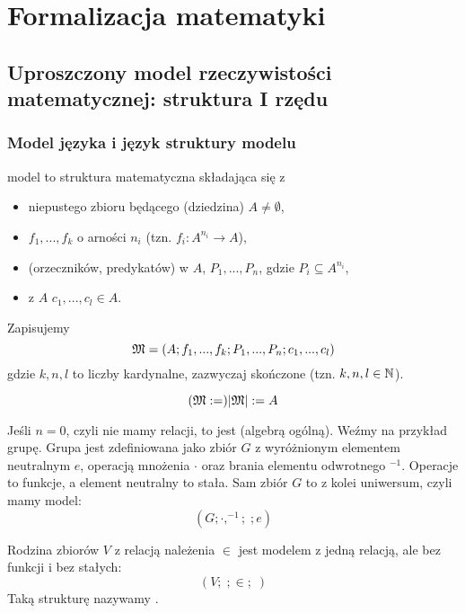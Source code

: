 \chapter{Formalizacja matematyki}

\section{Uproszczony model rzeczywistości matematycznej: struktura I rzędu}

\subsection{Model języka i język struktury modelu}

\begin{definition}{model}{}
   to struktura matematyczna składająca się z
  \begin{itemize}
    \item niepustego zbioru będącego  (dziedzina) $A\neq\emptyset$,
    \item {} $f_1,..., f_k$ o arności $n_i$ (tzn. $f_i:A^{n_i}\to A$),
    \item {} (orzeczników, predykatów) w $A$, $P_1,..., P_n$, gdzie $P_i\subseteq A^{n_i}$,
    \item {} z $A$ $c_1,..., c_l\in A$.
  \end{itemize}
\end{definition}

Zapisujemy
$$\mathfrak{M}=(A; f_1,...,f_k; P_1,...,P_n; c_1,...,c_l)$$
gdzie $k,n,l$ to liczby kardynalne, zazwyczaj skończone (tzn. $k,n,l\in\mathbb{N}$).

\begin{konwencja}{}{}
  $$(\mathfrak{M}:=)|\mathfrak{M}|:=A$$
\end{konwencja}

\begin{example}[m]
\item Jeśli $n=0$, czyli nie mamy relacji, to \Mm{} jest  (algebrą ogólną). Weźmy na przykład grupę. Grupa jest zdefiniowana jako zbiór $G$ z wyróżnionym elementem neutralnym $e$, operacją mnożenia $\cdot$ oraz brania elementu odwrotnego $^{-1}$. Operacje to funkcje, a element neutralny to stała. Sam zbiór $G$ to z kolei uniwersum, czyli mamy model:
  $$(G; \cdot, ^{-1};\;;e)$$
\item Rodzina zbiorów $V$ z relacją należenia $\in$ jest modelem z jedną relacją, ale bez funkcji i bez stałych:
  $$(V;\;;\in;\;)$$
  Taką strukturę nazywamy .
\end{example}

